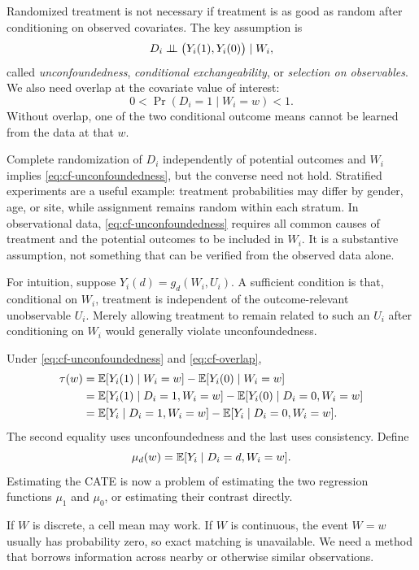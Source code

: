 Randomized treatment is not necessary if treatment is as good as random after
conditioning on observed covariates.  The key assumption is
\begin{equation}
  D_i\mathrel{\perp\!\!\!\perp}\bigl(Y_i(1),Y_i(0)\bigr)\mid W_i,
  \label{eq:cf-unconfoundedness}
\end{equation}
called \emph{unconfoundedness}, \emph{conditional exchangeability}, or
\emph{selection on observables}.  We also need overlap at the covariate value of
interest:
\begin{equation}
  0<\Pr(D_i=1\mid W_i=w)<1.
  \label{eq:cf-overlap}
\end{equation}
Without overlap, one of the two conditional outcome means cannot be learned from
the data at that $w$.

Complete randomization of $D_i$ independently of potential outcomes and $W_i$
implies \eqref{eq:cf-unconfoundedness}, but the converse need not hold.  Stratified
experiments are a useful example: treatment probabilities may differ by gender,
age, or site, while assignment remains random within each stratum.  In observational
data, \eqref{eq:cf-unconfoundedness} requires all common causes of treatment and the
potential outcomes to be included in $W_i$.  It is a substantive assumption, not
something that can be verified from the observed data alone.

For intuition, suppose $Y_i(d)=g_d(W_i,U_i)$.  A sufficient condition is that,
conditional on $W_i$, treatment is independent of the outcome-relevant unobservable
$U_i$.  Merely allowing treatment to remain related to such an $U_i$ after
conditioning on $W_i$ would generally violate unconfoundedness.

Under \eqref{eq:cf-unconfoundedness} and \eqref{eq:cf-overlap},
\begin{align}
  \tau(w)
  &=\mathbb{E}[Y_i(1)\mid W_i=w]-\mathbb{E}[Y_i(0)\mid W_i=w] \notag\\
  &=\mathbb{E}[Y_i(1)\mid D_i=1,W_i=w]
    -\mathbb{E}[Y_i(0)\mid D_i=0,W_i=w] \notag\\
  &=\mathbb{E}[Y_i\mid D_i=1,W_i=w]
    -\mathbb{E}[Y_i\mid D_i=0,W_i=w].
  \label{eq:cf-identification}
\end{align}
The second equality uses unconfoundedness and the last uses consistency.  Define
\[
  \mu_d(w)=\mathbb{E}[Y_i\mid D_i=d,W_i=w].
\]
Estimating the CATE is now a problem of estimating the two regression functions
$\mu_1$ and $\mu_0$, or estimating their contrast directly.

If $W$ is discrete, a cell mean may work.  If $W$ is continuous, the event $W=w$
usually has probability zero, so exact matching is unavailable.  We need a method
that borrows information across nearby or otherwise similar observations.

